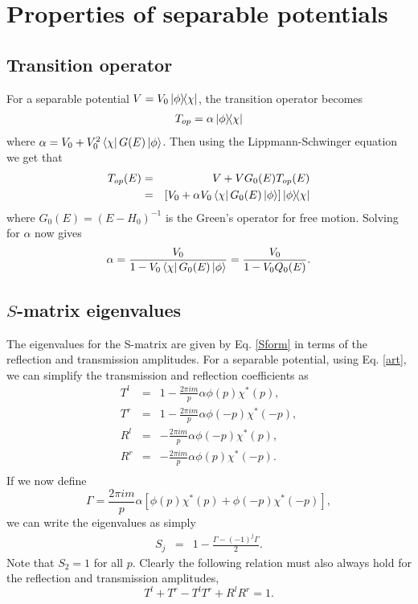 
\chapter{Properties of separable potentials}
\label{Appendix:SeparablePotentials}

\section{Transition operator}
\label{Appendix:SeparablePotentials_TransitionOperator}
 For a separable potential $V=V_0 \ketbra{\phi}{\chi}$, the transition operator becomes
\begin{eqnarray}
T_{op}=\alpha \ketbra{\phi}{\chi}
\end{eqnarray}
where $\alpha=V_{0}+V_{0}^{2}\bra{\chi}G(E)\ket{\phi}$. Then using the Lippmann-Schwinger equation we get that
%
\begin{eqnarray}
T_{op}(E)&=&V+VG_{0}(E)T_{op}(E)
\nonumber \\
&=& \left[V_{0}+\alpha V_{0} \bra{\chi}G_{0}(E)\ket{\phi}\right]\ketbra{\phi}{\chi}
\end{eqnarray}
%
where $G_{0}(E)=(E-H_{0})^{-1}$ is the Green's operator for free motion. Solving for $\alpha$ now gives
%
\begin{eqnarray}
\alpha =\frac{V_{0}}{1-V_{0} \bra{\chi}G_{0}(E)\ket{\phi}}
		   =\frac{V_{0}}{1-V_{0} Q_{0}(E)}.
\end{eqnarray}
%
%
%
%
%
\section{$S$-matrix eigenvalues}
%
%
%
%
The eigenvalues for the S-matrix are given by Eq. \eqref{Sform} in terms of the reflection and transmission amplitudes. For a separable potential, using Eq. \eqref{art}, we can simplify the transmission and reflection coefficients as
\begin{eqnarray}
T^{l}&=&1-\frac{2 \pi i m}{p} \alpha \phi(p) \chi^{*}(p),
\nonumber \\
T^{r}&=&1-\frac{2 \pi i m}{p} \alpha \phi(-p) \chi^{*}(-p),
\nonumber \\
R^{l}&=&-\frac{2 \pi i m}{p} \alpha \phi(-p) \chi^{*}(p),
\nonumber \\
R^{r}&=&-\frac{2 \pi i m}{p} \alpha \phi(p) \chi^{*}(-p).
\nonumber \\
\end{eqnarray}
%
If we now define
%
\begin{equation}
\Gamma=\frac{2 \pi i m}{p} \alpha \left[\phi(p) \chi^{*}(p)+\phi(-p) \chi^{*}(-p)\right],
\end{equation}
%
we can write the eigenvalues as simply
%
\begin{eqnarray}
S_{j}&=&1-\frac{\Gamma-(-1)^{j}\Gamma}{2}.
\end{eqnarray}
%
Note that $S_2=1$ for all $p$. Clearly the following relation must also always hold for the reflection and transmission amplitudes,
%
\begin{equation}
T^l + T^r - T^l T^r + R^l R^r = 1.
\end{equation}
%
%
%
%
%
%
%
%
